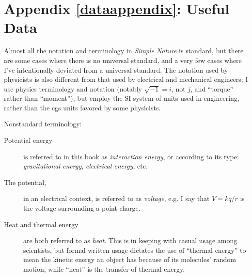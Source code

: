 \label{dataappendix}%
\appendix\chapter{Appendix \ref{dataappendix}: Useful Data}

\label{notationcompared}
Almost all the notation and terminology in \emph{Simple Nature} is standard, but there
are some cases where there is no universal standard, and a very few cases where
I've intentionally deviated from a universal standard. The notation used by physicists
is also different from that used by electrical and mechanical engineers; I use
physics terminology and notation (notably $\sqrt{-1}=i$, not $j$, and ``torque'' rather
than ``moment''), but employ the SI system of units used in engineering, rather than
the cgs units favored by some physicists.

\noindent Nonstandard terminology:
\begin{description}
	\item[Potential energy] is referred to in this book as \emph{interaction energy}, or
		according to its type: \emph{gravitational energy}, \emph{electrical energy}, etc.
	\item[The potential,] in an electrical context, is referred to as \emph{voltage},
		e.g. I say that $V=kq/r$ is the voltage surrounding a point charge.
	\item[Heat and thermal energy] are both referred to as \emph{heat}. This is in keeping
		with casual usage among scientists, but formal written usage dictates
		the use of ``thermal energy'' to mean the kinetic energy an object has because
		of its molecules' random motion, while ``heat'' is
		the transfer of thermal energy.
\end{description}


